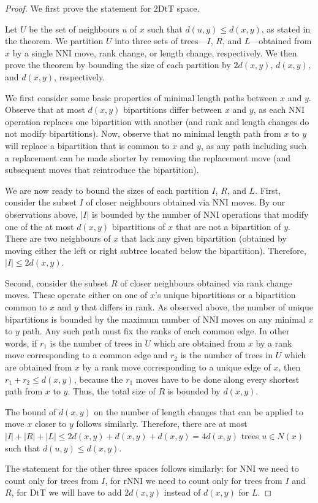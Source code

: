 \documentclass{amsart}
\newcommand{\dts}{\mathrm{2DtT}}
\newcommand{\nni}{\mathrm{NNI}}
\newcommand{\rnni}{\mathrm{rNNI}}
\newcommand{\mdts}{\mathrm{DtT}}
\begin{document}
\begin{proof}
We first prove the statement for $\dts$ space.

Let $U$ be the set of neighbours $u$ of $x$ such that $d(u,y) \le d(x,y)$, as stated in the theorem.
We partition $U$ into three sets of trees---$I$, $R$, and $L$---obtained from $x$ by a single NNI move, rank change, or length change, respectively.
We then prove the theorem by bounding the size of each partition by $2d(x,y)$, $d(x,y)$, and $d(x,y)$, respectively.

We first consider some basic properties of minimal length paths between $x$ and $y$.
Observe that at most $d(x,y)$ bipartitions differ between $x$ and $y$, as each NNI operation replaces one bipartition with another (and rank and length changes do not modify bipartitions).
Now, observe that no minimal length path from $x$ to $y$ will replace a bipartition that is common to $x$ and $y$, as any path including such a replacement can be made shorter by removing the replacement move (and subsequent moves that reintroduce the bipartition).

We are now ready to bound the sizes of each partition $I$, $R$, and $L$.
First, consider the subset $I$ of closer neighbours obtained via NNI moves.
By our observations above, $|I|$ is bounded by the number of NNI operations that modify one of the at most $d(x,y)$ bipartitions of $x$ that are not a bipartition of $y$.
There are two neighbours of $x$ that lack any given bipartition (obtained by moving either the left or right subtree located below the bipartition).
Therefore, $|I| \le 2d(x,y)$.

Second, consider the subset $R$ of closer neighbours obtained via rank change moves.
These operate either on one of $x$'s unique bipartitions or a bipartition common to $x$ and $y$ that differs in rank.
As observed above, the number of unique bipartitions is bounded by the maximum number of NNI moves on any minimal $x$ to $y$ path.
Any such path must fix the ranks of each common edge.
In other words, if $r_1$ is the number of trees in $U$ which are obtained from $x$ by a rank move corresponding to a common edge and $r_2$ is the number of trees in $U$ which are obtained from $x$ by a rank move corresponding to a unique edge of $x$, then $r_1 + r_2 \leq d(x,y)$, because the $r_1$ moves have to be done along every shortest path from $x$ to $y$.
Thus, the total size of $R$ is bounded by $d(x,y)$.

The bound of $d(x,y)$ on the number of length changes that can be applied to move $x$ closer to $y$ follows similarly.
Therefore, there are at most $|I| + |R| + |L| \le 2d(x,y) + d(x,y) + d(x,y) = 4d(x,y)$ trees $u \in N(x)$ such that $d(u, y) \le d(x, y)$.

The statement for the other three spaces follows similarly: for $\nni$ we need to count only for trees from $I$, for $\rnni$ we need to count only for trees from $I$ and $R$, for $\mdts$ we will have to add $2d(x,y)$ instead of $d(x,y)$ for $L$.
\end{proof}
\end{document}
